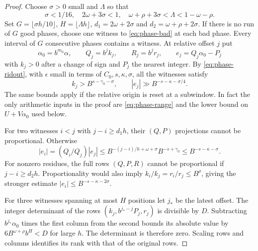 \begin{proof}
Choose \(\sigma>0\) small and \(\Lambda\) so that
\[
 \sigma<1/16,\quad 2\omega+3\sigma<1,\quad
 \omega+\rho+3\sigma<\Lambda<1-\omega-\rho.
\]
Set \(G=\lfloor\sigma h/10\rfloor\), \(H=\lfloor\Lambda h\rfloor\),
\(d_1=2\omega+2\sigma\) and \(d_2=\omega+\rho+2\sigma\).
If there is no run of \(G\) good phases, choose one witness to
\eqref{eq:phase-bad} at each bad phase. Every interval of \(G\)
consecutive phases contains a witness. At relative offset \(j\) put
\[
 \alpha_0=b^{m_0}\alpha,\qquad Q_j=b^j k_j,\qquad
 R_j=b^j r_j,\qquad e_j=Q_j\alpha_0-P_j
\]
with \(k_j>0\) after a change of sign and \(P_j\) the nearest integer.
By \eqref{eq:phase-ridout}, with \(\epsilon\) small in terms of
\(C_0,s,\kappa,\sigma\), all the witnesses satisfy
\begin{equation}\label{eq:phase-range}
 k_j>B^{s-\gamma_0-\sigma},\qquad
 |e_j|\gg B^{-s-\kappa-\sigma/4}.
\end{equation}
The same bounds apply if the relative origin is reset at a subwindow.
In fact the only arithmetic inputs in the proof are
\eqref{eq:phase-range} and the lower bound on \(U+V\alpha_0\)
used below.

For two witnesses \(i<j\) with \(j-i\ge d_1h\), their
\((Q,P)\) projections cannot be proportional. Otherwise
\[
 |e_i|=(Q_i/Q_j)|e_j|
 \le B^{-(j-i)/h+\omega+\sigma}B^{-s+\gamma_0}
 \le B^{-s-\kappa-\sigma}.
\]
For nonzero residues, the full rows \((Q,P,R)\) cannot be proportional
if \(j-i\ge d_2h\). Proportionality would also imply
\(k_i/k_j=r_i/r_j\le B^\rho\), giving the stronger estimate
\(|e_i|\le B^{-s-\kappa-2\sigma}\).

For three witnesses spanning at most \(H\) positions let \(j_*\) be the
latest offset. The integer determinant of the rows
\((k_j,b^{j_*-j}P_j,r_j)\) is divisible by \(D\). Subtracting
\(b^{j_*}\alpha_0\) times the first column from the second bounds its
absolute value by \(6B^{\omega+\rho}b^H<D\) for large \(h\).
The determinant is therefore zero. Scaling rows and columns identifies
its rank with that of the original rows.


\end{proof}
